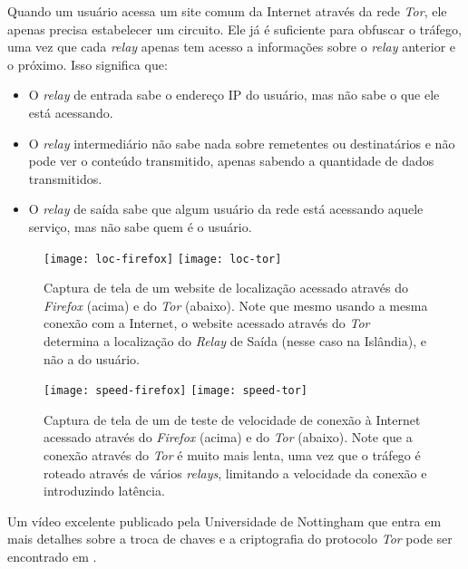 Quando um usuário acessa um site comum da Internet através da rede \textit{Tor}, ele apenas precisa estabelecer um circuito. Ele já é suficiente para obfuscar o tráfego, uma vez que cada \textit{relay} apenas tem acesso a informações sobre o \textit{relay} anterior e o próximo. Isso significa que:

\begin{itemize}
    \item O \textit{relay} de entrada sabe o endereço IP do usuário, mas não sabe o que ele está acessando.
    \item O \textit{relay} intermediário não sabe nada sobre remetentes ou destinatários e não pode ver o conteúdo transmitido, apenas sabendo a quantidade de dados transmitidos.
    \item O \textit{relay} de saída sabe que algum usuário da rede está acessando aquele serviço, mas não sabe quem é o usuário.
\end{itemize}

\begin{figure}
    \centering
    \texttt{[image: loc-firefox]}
    \texttt{[image: loc-tor]}
  
    \caption{Captura de tela de um website de localização acessado através do \textit{Firefox} (acima) e do \textit{Tor} (abaixo). Note que mesmo usando a mesma conexão com a Internet, o website acessado através do \textit{Tor} determina a localização do \textit{Relay} de Saída (nesse caso na Islândia), e não a do usuário.}
\end{figure}

\begin{figure}
    \centering
    \texttt{[image: speed-firefox]}
    \texttt{[image: speed-tor]}
  
    \caption{Captura de tela de um de teste de velocidade de conexão à Internet acessado através do \textit{Firefox} (acima) e do \textit{Tor} (abaixo). Note que a conexão através do \textit{Tor} é muito mais lenta, uma vez que o tráfego é roteado através de vários \textit{relays}, limitando a velocidade da conexão e introduzindo latência.}
\end{figure}

Um vídeo excelente publicado pela Universidade de Nottingham que entra em mais detalhes sobre a troca de chaves e a criptografia do protocolo \textit{Tor} pode ser encontrado em \cite{computerphile-tor}.

